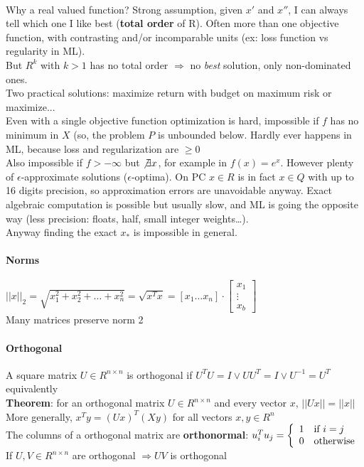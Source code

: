 \documentclass[10pt]{report}
\begin{document}
\paragraph{} Why a real valued function? Strong assumption, given $x'$ and $x''$, I can always tell which one I like best (\textbf{total order} of R). Often more than one objective function, with contrasting and/or incomparable units (ex: loss function vs regularity in ML).\\
But $R^k$ with $k > 1$ has no total order $\Rightarrow$ no \textit{best} solution, only non-dominated ones.\\
Two practical solutions: maximize return with budget on maximum risk or maximize...\\
Even with a single objective function optimization is hard, impossible if $f$ has no minimum in $X$ (so, the problem $P$ is unbounded below. Hardly ever happens in ML, because loss and regularization are $\geq 0$\\
Also impossible if $f > -\infty$ but $\not\exists x$, for example in $f(x) = e^x$. However plenty of $\epsilon$-approximate solutions ($\epsilon$-optima). On PC $x\in R$ is in fact $x\in Q$ with up to 16 digits precision, so approximation errors are unavoidable anyway. Exact algebraic computation is possible but usually slow, and ML is going the opposite way (less precision: floats, half, small integer weights\ldots).\\
Anyway finding the exact $x_*$ is impossible in general.
\paragraph{Norms}\begin{list}{}{}
	\item $||x||_2 = \sqrt{x_1^2 + x_2^2 + \ldots + x_n^2} = \sqrt{x^T x} = \left[x_1 \ldots x_n\right]\cdot\left[\begin{array}{c}
	x_1\\\vdots\\x_b
	\end{array}\right]$\\
	Many matrices preserve norm 2
\end{list}
\paragraph{Orthogonal} A square matrix $U\in R^{n\times n}$ is orthogonal if $U^TU = I \vee UU^T = I \vee U^{-1} = U^T$ equivalently\\
\textbf{Theorem}: for an orthogonal matrix $U\in R^{n\times n}$ and every vector $x$, $||Ux|| = ||x||$\\
More generally, $x^T y = (Ux)^T(Xy)$ for all vectors $x,y\in R^n$\\
The columns of a orthogonal matrix are \textbf{orthonormal}: $u_i^Tu_j = \left\{\begin{array}{l l}
1 &\hbox{if } i = j\\0&\hbox{otherwise}
\end{array}\right.$\\
If $U,V\in R^{n\times n}$ are orthogonal $\Rightarrow UV$ is orthogonal
\end{document}
